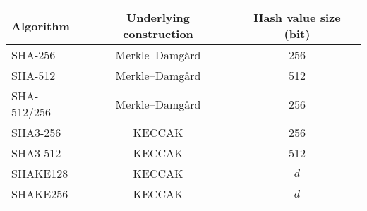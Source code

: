 \begin{tabular}{|l|c|c|}
  \hline
  Algorithm & Underlying construction & Hash value size (bit)  \\
  \hline
  \hline
  SHA-256 & Merkle–Damgård & 256 \\
  \hline
  SHA-512 & Merkle–Damgård & 512 \\
  \hline
  SHA-512/256 & Merkle–Damgård & 256 \\
  \hline
  SHA3-256 & KECCAK & 256 \\
  \hline
  SHA3-512 & KECCAK & 512 \\
  \hline
  SHAKE128 & KECCAK & $d$ \\
  \hline
  SHAKE256 & KECCAK & $d$ \\
  \hline
  
\end{tabular}